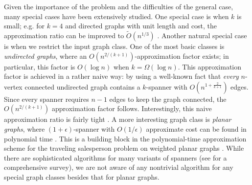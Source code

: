 Given the importance of the problem and the difficulties of the general case, many special cases have been extensively studied. 
One special case is when $k$ is small; e.g. for $k=4$ and directed graphs with unit length and cost, the approximation ratio can be improved to $\tilde O(n^{1/3})$ \cite{BermanBMRY13, DinitzZ16, KortsarzP94, KortsarzP98}.
Another natural special case is when we restrict the input graph class. 
One of the most basic classes is {\em undirected graphs}, where an $O(n^{2/(k+1)})$-approximation factor exists; in particular, this factor is $O(\log n)$ when $k=\Omega(\log n)$. 
This approximation factor is achieved in a rather naive way: by using a well-known fact that 
{\em every} $n$-vertex connected undirected graph contains a $k$-spanner with $O(n^{1+\frac{2}{k+1}})$ edges. Since every spanner requires $n-1$ edges to keep the graph connected, the $O(n^{2/(k+1)})$ approximation factor follows. Interestingly, this naive approximation ratio is fairly tight \cite{DinitzKR16}. 
A more interesting graph class is {\em planar graphs}, where $(1+\epsilon)$-spanner with $O(1/\epsilon)$ approximate cost can be found in polynomial time \cite{AlthoferDDJS93}. This is a building block in the polynomial-time approximation scheme for the traveling salesperson problem on weighted planar graphs \cite{AroraGKKW98}. 
While there are sophisticated algorithms for many variants of spanners (see \cite{AhmedBSHJKS20} for a comprehensive survey), we are not aware of any nontrivial algorithm for any special graph classes besides that for planar graphs.


